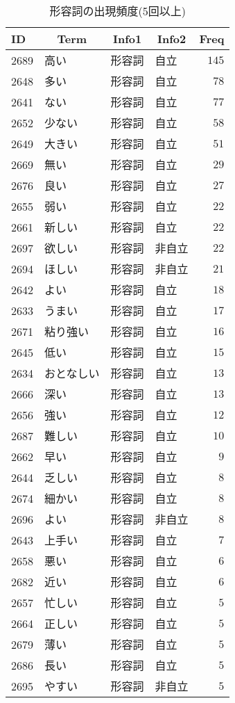 %
\begin{table}[!tbp]
\caption{形容詞の出現頻度(5回以上)\label{tab:形容詞}} 
\begin{center}
\begin{tabular}{llllr}
\toprule
\multicolumn{1}{l}{ID}&\multicolumn{1}{c}{Term}&\multicolumn{1}{c}{Info1}&\multicolumn{1}{c}{Info2}&\multicolumn{1}{c}{Freq}\tabularnewline
\midrule
2689&高い&形容詞&自立&$145$\tabularnewline
2648&多い&形容詞&自立&$ 78$\tabularnewline
2641&ない&形容詞&自立&$ 77$\tabularnewline
2652&少ない&形容詞&自立&$ 58$\tabularnewline
2649&大きい&形容詞&自立&$ 51$\tabularnewline
2669&無い&形容詞&自立&$ 29$\tabularnewline
2676&良い&形容詞&自立&$ 27$\tabularnewline
2655&弱い&形容詞&自立&$ 22$\tabularnewline
2661&新しい&形容詞&自立&$ 22$\tabularnewline
2697&欲しい&形容詞&非自立&$ 22$\tabularnewline
2694&ほしい&形容詞&非自立&$ 21$\tabularnewline
2642&よい&形容詞&自立&$ 18$\tabularnewline
2633&うまい&形容詞&自立&$ 17$\tabularnewline
2671&粘り強い&形容詞&自立&$ 16$\tabularnewline
2645&低い&形容詞&自立&$ 15$\tabularnewline
2634&おとなしい&形容詞&自立&$ 13$\tabularnewline
2666&深い&形容詞&自立&$ 13$\tabularnewline
2656&強い&形容詞&自立&$ 12$\tabularnewline
2687&難しい&形容詞&自立&$ 10$\tabularnewline
2662&早い&形容詞&自立&$  9$\tabularnewline
2644&乏しい&形容詞&自立&$  8$\tabularnewline
2674&細かい&形容詞&自立&$  8$\tabularnewline
2696&よい&形容詞&非自立&$  8$\tabularnewline
2643&上手い&形容詞&自立&$  7$\tabularnewline
2658&悪い&形容詞&自立&$  6$\tabularnewline
2682&近い&形容詞&自立&$  6$\tabularnewline
2657&忙しい&形容詞&自立&$  5$\tabularnewline
2664&正しい&形容詞&自立&$  5$\tabularnewline
2679&薄い&形容詞&自立&$  5$\tabularnewline
2686&長い&形容詞&自立&$  5$\tabularnewline
2695&やすい&形容詞&非自立&$  5$\tabularnewline
\bottomrule
\end{tabular}
\end{center}
\end{table}

